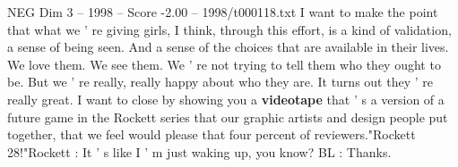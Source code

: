 \begin{textsample}{NEG Dim 3 – 1998 – Score -2.00 – 1998/t000118.txt}
I want to make the point that what we ' re giving girls, I think, through this effort, is a kind of validation, a sense of being seen.
And a sense of the choices that are available in their lives.
We love them.
We see them.
We ' re not trying to tell them who they ought to be.
But we ' re really, really happy about who they are.
It turns out they ' re really great.
I want to close by showing you a \textbf{videotape} that ' s a version of a future game in the Rockett series that our graphic artists and design people put together, that we feel would please that four percent of reviewers."Rockett 28!"Rockett : It ' s like I ' m just waking up, you know?
BL : Thanks.

\end{textsample}
